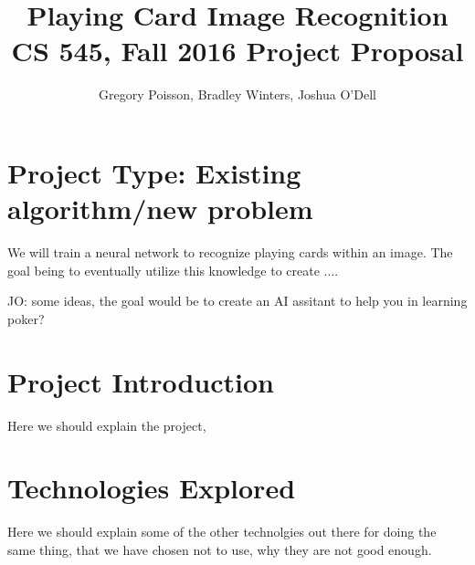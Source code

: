 \documentclass{article}
\begin{document}
\title{ Playing Card Image Recognition\\[1ex] \footnotesize\mdseries CS 545, Fall 2016 Project Proposal }
\author{Gregory Poisson, Bradley Winters, Joshua O'Dell}
\maketitle

\noindent\hrulefill
\vspace{-5mm} %

\section{Project Type:  Existing algorithm/new problem}
We will train a neural network to recognize playing cards within an image.  The goal being to eventually utilize this knowledge to create ....

JO: some ideas, the goal would be to create an AI assitant to help you in learning poker?

\section{Project Introduction}
Here we should explain the project, 

\section{Technologies Explored}
Here we should explain some of the other technolgies out there for doing the same thing, that we have chosen not to use, why they are not good enough.



\nocite{*}


\end{document}
